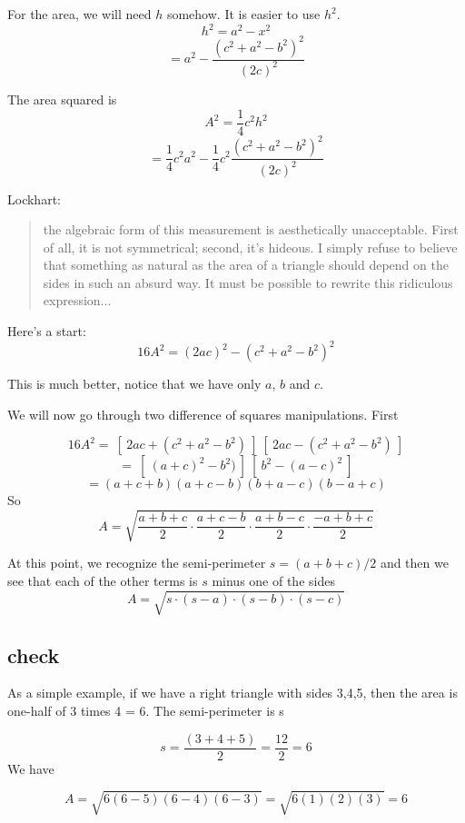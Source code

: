 \documentclass[11pt, oneside]{article}
\begin{document}
For the area, we will need $h$ somehow.  It is easier to use $h^2$.
\[ h^2 = a^2 - x^2 \]
\[ = a^2 - \frac{(c^2 + a^2-b^2)^2}{(2c)^2}  \]

The area squared is
\[ A^2 = \frac{1}{4}c^2 h^2 \]
\[ = \frac{1}{4} c^2 a^2 - \frac{1}{4} c^2 \frac{(c^2 + a^2-b^2)^2}{(2c)^2}  \]

Lockhart:

\begin{quote}
the algebraic form of this measurement is aesthetically unacceptable. First of all, it is not symmetrical; second, it's hideous. I simply refuse to believe that something as natural as the area of a triangle should depend on the sides in such an absurd way. It must be possible to rewrite this ridiculous expression...
\end{quote}

Here's a start:
\[ 16A^2 = (2ac)^2 - (c^2 + a^2-b^2)^2 \]

This is much better, notice that we have only $a$, $b$ and $c$.

We will now go through two difference of squares manipulations.  First

\[ 16A^2 = \ [ \ 2ac + (c^2 + a^2-b^2) \ ] \ [ \ 2ac - (c^2 + a^2-b^2) \ ]  \]
\[ = \ [ \ (a + c)^2 -b^2) \ ] \ [ \ b^2 - (a - c)^2 \ ]  \]
\[ =  (a + c + b)(a + c - b)(b + a - c)(b - a + c) \]
So
\[ A = \sqrt{\frac{a + b + c}{2}  \cdot \frac{a + c - b}{2}  \cdot \frac{a + b - c}{2}  \cdot \frac{-a + b + c}{2} } \]

At this point, we recognize the semi-perimeter $s = (a + b + c)/2$ and then we see that each of the other terms is $s$ minus one of the sides
\[ A = \sqrt{s \cdot (s - a) \cdot (s - b) \cdot (s - c) } \]
\subsection*{check}
As a simple example, if we have a right triangle with sides 3,4,5, then the area is one-half of 3 times 4 = 6.  The semi-perimeter is s

\[ s = \frac{(3 + 4 + 5)}{2} = \frac{12}{2} = 6 \]
We have

\[ A =  \sqrt { 6 (6-5) (6-4) (6-3) } =  \sqrt { 6 (1) (2) (3) } = 6 \]
\end{document}
